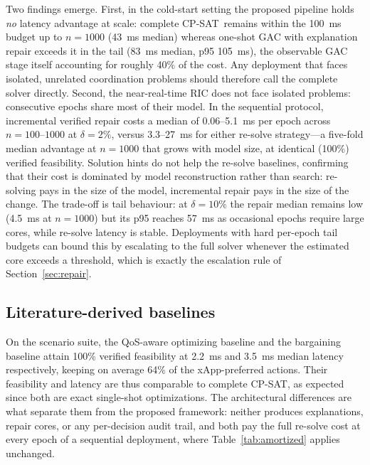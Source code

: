 \documentclass[pdflatex,sn-mathphys-num,iicol,oneside]{sn-jnl}
\newcommand{\cpsat}{\textsc{CP-SAT}}
\begin{document}
Two findings emerge. First, in the cold-start setting the proposed
pipeline holds \emph{no} latency advantage at scale: complete \cpsat\
remains within the 100~ms budget up to $n=1000$ (43~ms median) whereas
one-shot GAC with explanation repair exceeds it in the tail (83~ms
median, p95 105~ms), the observable GAC stage itself accounting for
roughly 40\% of the cost. Any deployment that faces isolated,
unrelated coordination problems should therefore call the complete
solver directly. Second, the near-real-time RIC does not face isolated
problems: consecutive epochs share most of their model. In the
sequential protocol, incremental verified repair costs a median of
0.06--5.1~ms per epoch across $n=100$--$1000$ at $\delta=2\%$, versus
3.3--27~ms for either re-solve strategy---a five-fold median advantage
at $n=1000$ that grows with model size, at identical (100\%) verified
feasibility. Solution hints do not help the re-solve baselines,
confirming that their cost is dominated by model reconstruction rather
than search: re-solving pays in the size of the model, incremental
repair pays in the size of the change. The trade-off is tail behaviour:
at $\delta=10\%$ the repair median remains low (4.5~ms at $n=1000$) but
its p95 reaches 57~ms as occasional epochs require large cores, while
re-solve latency is stable. Deployments with hard per-epoch tail
budgets can bound this by escalating to the full solver whenever the
estimated core exceeds a threshold, which is exactly the escalation
rule of Section~\ref{sec:repair}.

\subsection{Literature-derived baselines}

On the scenario suite, the QoS-aware optimizing baseline and the
bargaining baseline attain 100\% verified feasibility at 2.2~ms and
3.5~ms median latency respectively, keeping on average 64\% of the
xApp-preferred actions. Their feasibility and latency are thus
comparable to complete \cpsat, as expected since both are exact
single-shot optimizations. The architectural differences are what
separate them from the proposed framework: neither produces
explanations, repair cores, or any per-decision audit trail, and both
pay the full re-solve cost at every epoch of a sequential deployment,
where Table~\ref{tab:amortized} applies unchanged.

\end{document}
